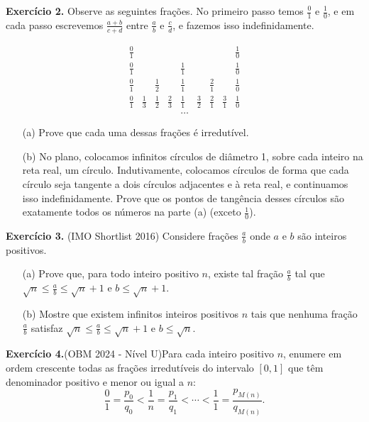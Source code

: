 \documentclass{hipatia}
\theoremstyle{definition} %
\begin{document}

\noindent\textbf{Exercício 2.} Observe as seguintes frações. No primeiro passo temos $\frac{0}{1}$ e $\frac{1}{0}$, e em cada passo escrevemos $\frac{a+b}{c+d}$ entre $\frac{a}{b}$ e $\frac{c}{d}$, e fazemos isso indefinidamente.

\[ \begin{array}{ccccccccccccccccccccccccc}\frac{0}{1}&&&&&&&&\frac{1}{0}\\ \frac{0}{1}&&&&\frac{1}{1}&&&&\frac{1}{0}\\ \frac{0}{1}&&\frac{1}{2}&&\frac{1}{1}&&\frac{2}{1}&&\frac{1}{0}\\ \frac{0}{1}&\frac{1}{3}&\frac{1}{2}&\frac{2}{3}&\frac{1}{1}&\frac{3}{2}&\frac{2}{1}&\frac{3}{1}&\frac{1}{0}\\ &&&&\dots\end{array}\]

\begin{itemize}
\item[(a)] Prove que cada uma dessas frações é irredutível.
\item[(b)] No plano, colocamos infinitos círculos de diâmetro 1, sobre cada inteiro na reta real, um círculo. Indutivamente, colocamos círculos de forma que cada círculo seja tangente a dois círculos adjacentes e à reta real, e continuamos isso indefinidamente. Prove que os pontos de tangência desses círculos são exatamente todos os números na parte (a) (exceto $\frac{1}{0}$).
\end{itemize}


\noindent\textbf{Exercício 3.} (IMO Shortlist 2016) Considere frações $\frac{a}{b}$ onde $a$ e $b$ são inteiros positivos.

\begin{itemize}
\item[(a)] Prove que, para todo inteiro positivo $n$, existe tal fração $\frac{a}{b}$ tal que $\sqrt{n} \leq \frac{a}{b} \leq \sqrt{n} + 1$ e $b \leq \sqrt{n} + 1$.
\item[(b)] Mostre que existem infinitos inteiros positivos $n$ tais que nenhuma fração $\frac{a}{b}$ satisfaz $\sqrt{n} \leq \frac{a}{b} \leq \sqrt{n} + 1$ e $b \leq \sqrt{n}$.
\end{itemize}

\noindent\textbf{Exercício 4.}(OBM 2024 - Nível U)Para cada inteiro positivo $n$, enumere em ordem crescente todas as frações irredutíveis do intervalo $[0, 1]$ que têm denominador positivo e menor ou igual a $n$:
$$
\frac{0}{1} = \frac{p_0}{q_0} < \frac{1}{n} = \frac{p_1}{q_1} < \cdots < \frac{1}{1} = \frac{p_{M(n)}}{q_{M(n)}}.
$$
\end{document}
